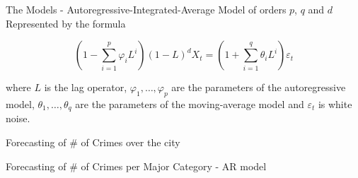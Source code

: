 \documentclass[12pt]{beamer}
\begin{document}
        \begin{frame}{The Models - Autoregressive-Integrated-Average Model of orders $p$, $q$ and $d$}
            Represented by the formula

            \begin{equation*}
                \left ( 1 - \sum_{i=1}^p\varphi_iL^i\right )(1 - L)^dX_t =
                \left ( 1 + \sum_{i = 1}^{q}\theta_iL^i \right ) \varepsilon_t
            \end{equation*}

            where $L$ is the lag operator, $\varphi_{1}, \ldots , \varphi_{p}$ are the parameters of the
            autoregressive model, $\theta_1, \ldots, \theta_q$ are the parameters of the moving-average
            model and $\varepsilon _{t}$ is white noise.
        \end{frame}

        \begin{frame}{Forecasting of \# of Crimes over the city}
            \begin{figure}
                \centering
            \end{figure}
        \end{frame}

        \begin{frame}{Forecasting of \# of Crimes per Major Category - AR model}
            \begin{figure}
                \centering
            \end{figure}
        \end{frame}
\end{document}
